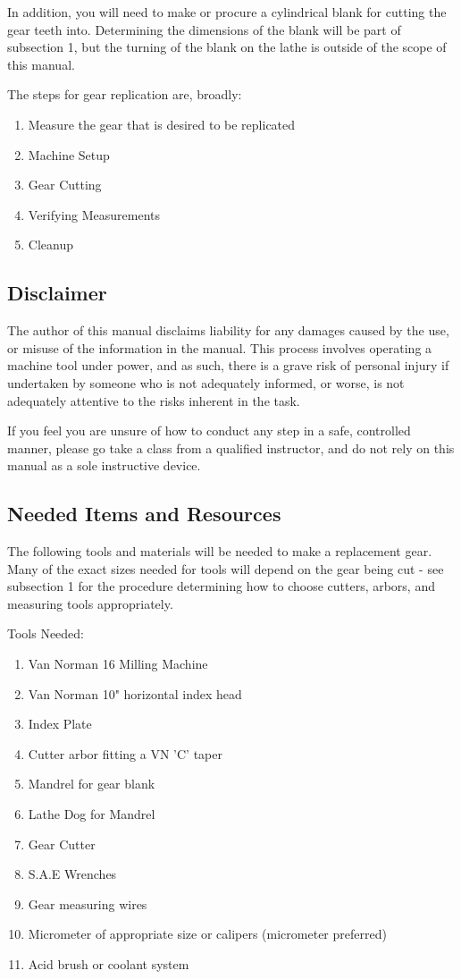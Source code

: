 \documentclass[12pt,twoside,letterpaper]{article}
\begin{document}
In addition, you will need to make or procure a cylindrical blank for cutting the gear teeth into. Determining the dimensions of the blank will be part of subsection 1, but the turning of the blank on the lathe is outside of the scope of this manual.


The steps for gear replication are, broadly:

\begin{enumerate}
\item Measure the gear that is desired to be replicated
\item Machine Setup
\item Gear Cutting
\item Verifying Measurements
\item Cleanup
\end{enumerate}


\subsection{Disclaimer}

The author of this manual disclaims liability for any damages caused by the use, or misuse of the information in the manual. This process involves operating a machine tool under power, and as such, there is a grave risk of personal injury if undertaken by someone who is not adequately informed, or worse, is not adequately attentive to the risks inherent in the task. 

If you feel you are unsure of how to conduct any step in a safe, controlled manner, please go take a class from a qualified instructor, and do not rely on this manual as a sole instructive device. 


\subsection{ Needed Items and Resources}

The following tools and materials will be needed to make a replacement gear. Many of the exact sizes needed for tools will depend on the gear being cut - see subsection 1 for the procedure determining how to choose cutters, arbors, and measuring tools appropriately.

Tools Needed: 

\begin{enumerate}
\item Van Norman 16 Milling Machine
\item Van Norman 10" horizontal index head
\item Index Plate
\item Cutter arbor fitting a VN 'C' taper
\item Mandrel for gear blank
\item Lathe Dog for Mandrel
\item Gear Cutter
\item S.A.E Wrenches
\item Gear measuring wires
\item Micrometer of appropriate size or calipers (micrometer preferred)
\item Acid brush or coolant system
\end{enumerate}
\end{document}

